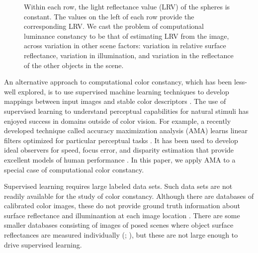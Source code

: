 \documentclass{jov}
\begin{document}
\begin{figure}
{Within each row, the light reflectance value (LRV) of the spheres is constant. The values on the left of each row provide the corresponding LRV. We cast the problem of computational luminance constancy to be that of estimating LRV from the image, across variation in other scene factors: variation in relative surface reflectance, variation in illumination, and variation in the reflectance of the other objects in the scene.}
 \end{figure}

An alternative approach to computational color constancy, which has been less-well explored, is to use supervised machine learning techniques to develop mappings between input images and stable color descriptors \cite{barron2015convolutional}. The use of supervised learning to understand perceptual capabilities for natural stimuli has enjoyed success in domains outside of color vision. For example, a recently developed technique called accuracy maximization analysis (AMA) learns linear filters optimized for particular perceptual tasks \cite{geisler2009optimal}. It has been used to develop ideal observers for speed, focus error, and disparity estimation that provide excellent models of human performance \cite{burge2011optimal, burge2014optimal, burge2015optimal}. In this paper, we apply AMA to a special case of computational color constancy. 

Supervised learning requires large labeled data sets.  Such data sets are not readily available for the study of color constancy. Although there are databases of calibrated color images, these do not provide ground truth information about surface reflectance and illuminantion at each image location \cite{ChakrabartiHyperspectral,NascimentoFoster2016,ParragaHyperspectralData,TkacikUpennHypersepctralData,skauli2013collection,olmos2004biologically}. There are some smaller databases consisting of images of posed scenes where object surface reflectances are measured individually (; \citeauthor{davidPennHyperspectral}), but these are not large enough to drive supervised learning.
 
\end{document}
